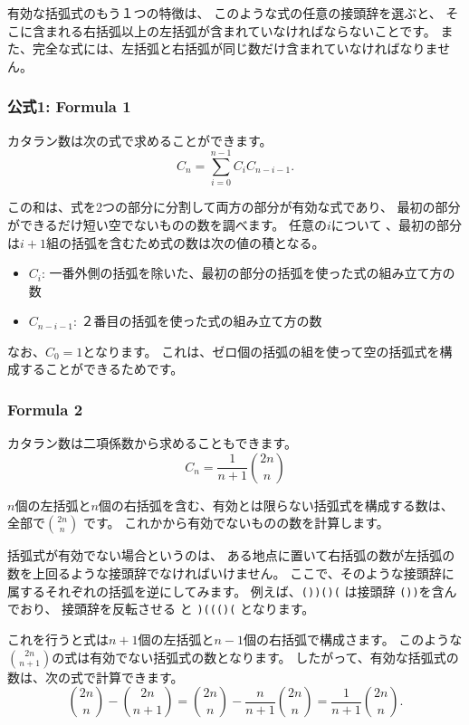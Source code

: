有効な括弧式のもう１つの特徴は、
このような式の任意の接頭辞を選ぶと、
そこに含まれる右括弧以上の左括弧が含まれていなければならないことです。
また、完全な式には、左括弧と右括弧が同じ数だけ含まれていなければなりません。

\subsubsection{公式1: Formula 1}

カタラン数は次の式で求めることができます。
\[ C_n = \sum_{i=0}^{n-1} C_{i} C_{n-i-1}.\]

この和は、式を2つの部分に分割して両方の部分が有効な式であり、
最初の部分ができるだけ短い空でないものの数を調べます。
任意の$i$について 、最初の部分は$i + 1$組の括弧を含むため式の数は次の値の積となる。

\begin{itemize}
\item $C_{i}$: 一番外側の括弧を除いた、最初の部分の括弧を使った式の組み立て方の数
\item $C_{n-i-1}$: ２番目の括弧を使った式の組み立て方の数
\end{itemize}

なお、$C_0=1$となります。
これは、ゼロ個の括弧の組を使って空の括弧式を構成することができるためです。

\subsubsection{Formula 2}

カタラン数は二項係数から求めることもできます。
\[ C_n = \frac{1}{n+1} {2n \choose n}\]

$n$個の左括弧と$n$個の右括弧を含む、有効とは限らない括弧式を構成する数は、
全部で${2n \choose n}$ です。
これかから有効でないものの数を計算します。

括弧式が有効でない場合というのは、
ある地点に置いて右括弧の数が左括弧の数を上回るような接頭辞でなければいけません。
ここで、そのような接頭辞に属するそれぞれの括弧を逆にしてみます。
例えば、\texttt{())()(} は接頭辞 \texttt{())}を含んでおり、
接頭辞を反転させる と \texttt{)((()(} となります。

これを行うと式は$n + 1$個の左括弧と$n - 1$個の右括弧で構成さます。
このような${2n \choose n+1}$の式は有効でない括弧式の数となります。
したがって、有効な括弧式の数は、次の式で計算できます。
\[{2n \choose n}-{2n \choose n+1} = {2n \choose n} - \frac{n}{n+1} {2n \choose n} = \frac{1}{n+1} {2n \choose n}.\]

